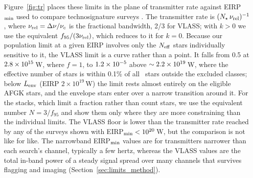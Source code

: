 \documentclass[linenumbers]{aastex702}
\begin{document}


Figure~\ref{fig:tr} places these limits in the plane of transmitter rate against EIRP$_{\rm min}$ used to compare technosignature surveys \citep{Enriquez2017,Price2020,Painter2025}. The transmitter rate is $(N_\star\,\nu_{\rm rel})^{-1}$, where $\nu_{\rm rel}=\Delta\nu/\nu_c$ is the fractional bandwidth, 2/3 for VLASS; with $k>0$ we use the equivalent $f_{95}/(3\nu_{\rm rel})$, which reduces to it for $k=0$. Because our population limit at a given EIRP involves only the $N_{\rm eff}$ stars individually sensitive to it, the VLASS limit is a curve rather than a point. It falls from 0.5 at $2.8\times10^{15}$\,W, where $f=1$, to $1.2\times10^{-5}$ above $\sim2.2\times10^{19}$\,W, where the effective number of stars is within 0.1\% of all \NAllFloor\ stars outside the excluded classes; below $L_{\rm env}$ (EIRP $2\times10^{19}$\,W) the limit rests almost entirely on the eligible AFGK stars, and the envelope stars enter over a narrow transition around it. For the stacks, which limit a fraction rather than count stars, we use the equivalent number $N=3/f_{95}$ and show them only where they are more constraining than the individual limits. The VLASS floor is lower than the transmitter rate reached by any of the surveys shown with EIRP$_{\rm min}<10^{20}$\,W, but the comparison is not like for like. The narrowband EIRP$_{\rm min}$ values are for transmitters narrower than each search's channel, typically a few hertz, whereas the VLASS values are the total in-band power of a steady signal spread over many channels that survives flagging and imaging (Section~\ref{sec:limits_method}).
\end{document}
